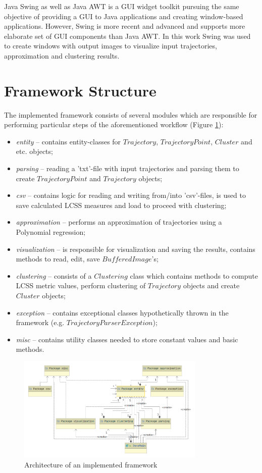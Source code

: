 Java Swing as well as Java AWT is a GUI widget toolkit pursuing the same objective of providing a GUI to Java applications and creating window-based applications. However, Swing is more recent and advanced and supports more elaborate set of GUI components than Java AWT. In this work Swing was used to create windows with output images to visualize input trajectories, approximation and clustering results.

\section{Framework Structure}

The implemented framework consists of several modules which are responsible for performing particular steps of the aforementioned workflow (Figure \ref{fig:proj-arch}):

\begin{itemize}
	\setlength\itemsep{-0.2em}
	\item \textit{entity} -- contains entity-classes for $Trajectory$, $TrajectoryPoint$, $Cluster$ and etc. objects;
	\item \textit{parsing} -- reading a 'txt'-file with input trajectories and parsing them to create $TrajectoryPoint$ and $Trajectory$ objects;
	\item \textit{csv} -- contains logic for reading and writing from/into 'csv'-files, is used to save calculated LCSS measures and load to proceed with clustering;
	\item \textit{approximation} -- performs an approximation of trajectories using a Polynomial regression;
	\item \textit{visualization} -- is responsible for visualization and saving the results, contains methods to read, edit, save $BufferedImage$'s;
	\item \textit{clustering} -- consists of a $Clustering$ class which contains methods to compute LCSS metric values, perform clustering of $Trajectory$ objects and create $Cluster$ objects;
	\item \textit{exception} -- contains exceptional classes hypothetically thrown in the framework (e.g. $TrajectoryParserException$);
	\item \textit{misc} -- contains utility classes needed to store constant values and basic methods.
\end{itemize}

\begin{figure}[!htb]
	\centering{}
	\includegraphics[width=0.8\textwidth]{images/proj-arch.png}
	\caption{Architecture of an implemented framework}
	\label{fig:proj-arch}
\end{figure}

